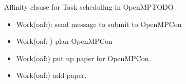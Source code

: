 

\begin{frame}{Affinity clause for Task scheduling in OpenMP}{TODO} 
\begin{itemize} 
\pitem Work(uds:): update reference implementation. 
\pitem Work(oaf:): show algorithms for oaf from thesis.   
\item Work(oaf:): send message to submit to OpenMPCon
\item Work(oaf: ) plan OpenMPCon 
\item Work(oaf:) put up paper for OpenMPCon. 
\item Work(oaf:) add paper. 
\end{itemize}
\end{frame}


